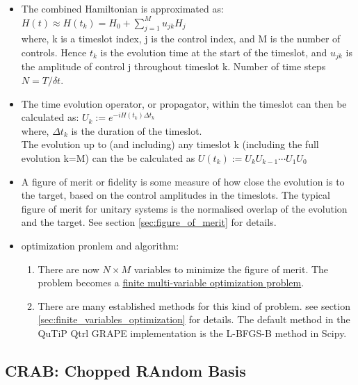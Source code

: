 \documentclass[12pt]{article}
\begin{document}
\begin{itemize}
    \item The combined Hamiltonian is approximated as: $H(t) \approx H\left(t_k\right)=H_0+\sum_{j=1}^M u_{j k} H_j$ \\
    where,  k is a timeslot index, 
            j is the control index, 
            and M is the number of controls. 
            Hence $t_k$ is the evolution time at the start of the timeslot, 
            and $u_{jk}$ is the amplitude of control j throughout timeslot k.
            Number of time steps $N=T/\delta t$.\\
    \item The time evolution operator, or propagator, within the timeslot can then be calculated as:  
            $U_k:=e^{-i H\left(t_k\right) \Delta t_k}$ \\
            where, $\Delta t_k$ is the duration of the timeslot.\\
            The evolution up to (and including) any timeslot k (including the full evolution k=M) can the be calculated as 
            $U\left(t_k\right):=U_k U_{k-1} \cdots U_1 U_0$
    \item A figure of merit or fidelity is some measure of how close the evolution is to the target, based on the control amplitudes in the timeslots. 
            The typical figure of merit for unitary systems is the normalised overlap of the evolution and the target. 
            See section \ref{sec:figure_of_merit} for details. 
    \item optimization pronlem and algorithm: 
        \begin{enumerate}
            \item There are now $N\times M$ variables to minimize the figure of merit. 
                The problem becomes a \underline{finite multi-variable optimization problem}.
            \item There are many established methods for this kind of problem. see section \ref{sec:finite_variables_optimization} for details. 
                The default method in the QuTiP Qtrl GRAPE implementation is the L-BFGS-B method in Scipy.
        \end{enumerate}
\end{itemize}

\subsection{CRAB: Chopped RAndom Basis}
\end{document}
